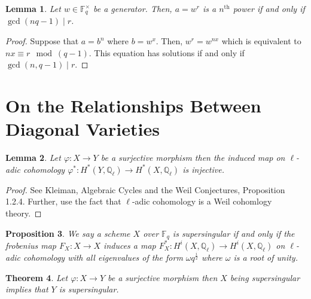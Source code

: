 \documentclass{article}
\newcommand{\Q}{\mathbb{Q}}
\newcommand{\finfield}[1]{\mathbb{F}_{#1}}
\newcommand{\finunits}[1]{\mathbb{F}_{#1}^\times}
\newcommand{\divides}{\mid}
\newtheorem{theorem}{Theorem}[section]
\newtheorem{lemma}[theorem]{Lemma}
\newtheorem{proposition}[theorem]{Proposition}
\theoremstyle{definition}
\theoremstyle{definition}
\theoremstyle{remark}
\begin{document}
\begin{lemma}
Let $w \in \finunits{q}$ be a generator. Then, $a = w^r$ is a $n^{\mathrm{th}}$ power if and only if $\gcd(n q-1) \divides r$.  
\end{lemma}

\begin{proof}
Suppose that $a = b^n$ where $b = w^x$. Then, $w^r = w^{n x}$ which is equivalent to $nx \equiv r \mod (q-1)$. This equation has solutions if and only if $\gcd(n, q-1) \divides r$.  
\end{proof}

\section{On the Relationships Between Diagonal Varieties}

\begin{lemma}
Let $\varphi : X \to Y$ be a surjective morphism then the induced map on $\ell$-adic cohomology $\varphi^* : H^*(Y, \Q_{\ell}) \to H^*(X, \Q_{\ell})$ is injective. 
\end{lemma}

\begin{proof}
See Kleiman, Algebraic Cycles and the Weil Conjectures, Proposition 1.2.4. Further, use the fact that $\ell$-adic cohomology is a Weil cohomlogy theory. 
\end{proof}

\begin{proposition} \label{prop:surjective_induces_injection_cohomology}
We say a scheme $X$ over $\finfield{q}$ is supersingular if and only if the frobenius map $F_X : X \to X$ induces a map $F^*_X : H^i(X, \Q_{\ell}) \to H^i(X, \Q_{\ell})$ on $\ell$-adic cohomology with all eigenvalues of the form $\omega q^{\frac{i}{2}}$ where $\omega$ is a root of unity.  
\end{proposition}

\begin{theorem} \label{lem:map_gives_supersingular_implication}
Let $\varphi : X \to Y$ be a surjective morphism then $X$ being supersingular implies that $Y$ is supersingular. 
\end{theorem}
\end{document}
